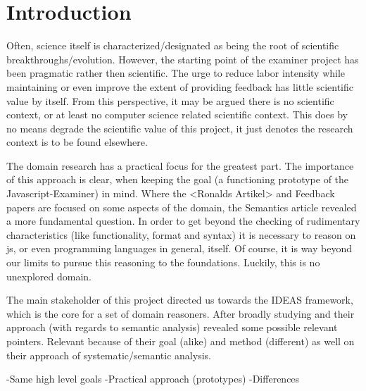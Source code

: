 
\section{Introduction}

Often, science itself is characterized/designated as being the root of 
scientific breakthroughs/evolution. However, the starting point of the 
\gls{examiner} project has been pragmatic rather then scientific. 
The urge to reduce labor intensity while
maintaining or even improve the extent of providing \gls{feedback} has little 
scientific value by itself. From this perspective, it may be argued there is 
no scientific context, or at least no computer science related scientific 
context. This does by no means degrade the scientific value of this project, 
it just denotes the research context is to be found elsewhere. 

The domain research has a practical focus for the greatest part. The importance of
this approach is clear, when keeping the goal (a functioning prototype
of the Javascript-Examiner) in mind. Where the <Ronalds Artikel> and Feedback
papers are focused on some aspects of the domain, the Semantics article revealed
a more fundamental question. In order to get beyond the checking of rudimentary
characteristics (like functionality, format and syntax) it is necessary to 
reason on \gls{js}, or even programming languages in general, itself. Of
course, it is way beyond our limits to pursue this reasoning to the
foundations. Luckily, this is no unexplored domain.

The main stakeholder of this project directed us towards the IDEAS framework,
which is the core for a set of domain reasoners. 
After broadly studying \citep{gerdes2012ask} and \citep{heeren2010specifying}
their approach (with regards to semantic analysis) 
revealed some possible relevant pointers. Relevant because of their goal (alike)
and method (different) as well on their approach of systematic/semantic analysis.

-Same high level goals
-Practical approach (prototypes)
-Differences 

